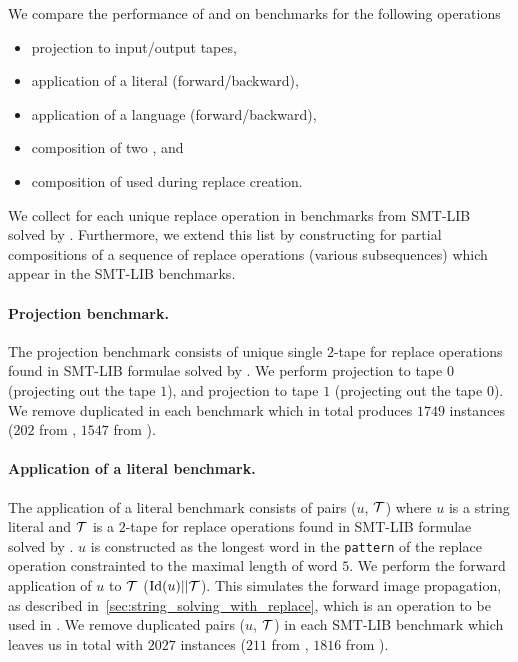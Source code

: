 We compare the performance of \mata and \mona on benchmarks for the following operations
\begin{itemize}
  \item projection to input/output tapes,
  \item application of a literal (forward/backward),
  \item application of a language (forward/backward),
  \item composition of two \nfts, and
  \item composition of \nfts used during replace \nft creation.
\end{itemize}

We collect \nfts for each unique replace operation in benchmarks from SMT-LIB solved by \noodler.
Furthermore, we extend this list by constructing \nfts for partial compositions of a sequence of replace operations (various subsequences) which appear in the SMT-LIB benchmarks.

\paragraph{Projection benchmark.}
The projection benchmark consists of unique single $2$-tape \nfts for replace operations found in SMT-LIB formulae solved by \noodler.
We perform projection to tape $0$ (projecting out the tape $1$), and projection to tape $1$ (projecting out the tape $0$).
We remove duplicated \nfts in each benchmark which in total produces $1749$ instances ($202$ from \webapp, $1547$ from \transducerPlus).

\paragraph{Application of a literal benchmark.}
The application of a literal benchmark consists of pairs ($u$, $\mathcal{T}$) where $u$ is a string literal and $\mathcal{T}$ is a $2$-tape \nft for replace operations found in SMT-LIB formulae solved by \noodler.
$u$ is constructed as the longest word in the \texttt{pattern} of the replace operation constrainted to the maximal length of word $5$.
We perform the forward application of $u$ to $\mathcal{T}$ ($\text{Id}(u) || \mathcal{T} $).
This simulates the forward image propagation, as described in~\ref{sec:string_solving_with_replace}, which is an operation to be used in \noodler.
We remove duplicated pairs ($u$, $\mathcal{T}$) in each SMT-LIB benchmark which leaves us in total with $2027$ instances ($211$ from \webapp, $1816$ from \transducerPlus).

